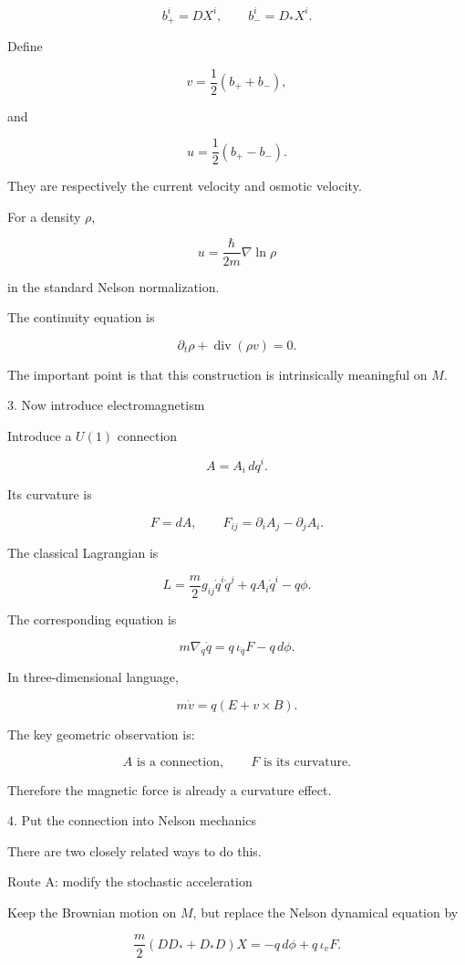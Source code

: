 $$ b^i_+=DX^i, \qquad b^i_-=D_*X^i. $$

Define

$$ v = \frac12(b_++b_-), $$

and

$$ u = \frac12(b_+-b_-). $$

They are respectively the current velocity and osmotic velocity.

For a density \(\rho\),

$$ \boxed{ u = \frac{\hbar}{2m}\nabla\ln\rho } $$

in the standard Nelson normalization.

The continuity equation is

$$ \boxed{ \partial_t\rho+\operatorname{div}(\rho v)=0. } $$

The important point is that this construction is intrinsically meaningful on \(M\).

3. Now introduce electromagnetism

Introduce a \(U(1)\) connection

$$ A=A_i\,dq^i. $$

Its curvature is

$$ \boxed{ F=dA, \qquad F_{ij} = \partial_iA_j-\partial_jA_i. } $$

The classical Lagrangian is

$$ L = \frac{m}{2}g_{ij}\dot q^i\dot q^j + qA_i\dot q^i - q\phi. $$

The corresponding equation is

$$ m\nabla_{\dot q}\dot q = q\,\iota_{\dot q}F -q\,d\phi. $$

In three-dimensional language,

$$ m\dot v = q(E+v\times B). $$

The key geometric observation is:

$$ \boxed{ A\text{ is a connection},\qquad F\text{ is its curvature}. } $$

Therefore the magnetic force is already a curvature effect.

4. Put the connection into Nelson mechanics

There are two closely related ways to do this.

Route A: modify the stochastic acceleration

Keep the Brownian motion on \(M\), but replace the Nelson dynamical equation by

$$ \boxed{ \frac{m}{2} \left(D D_*+D_*D\right)X = -q\,d\phi + q\,\iota_vF. } $$

